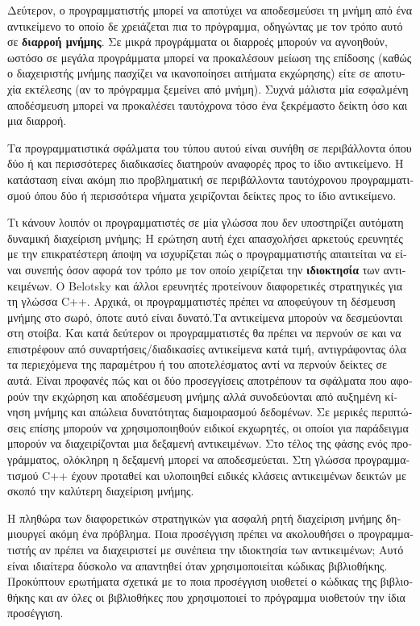 \begin{greek}
Δεύτερον, ο προγραμματιστής μπορεί να αποτύχει να αποδεσμεύσει
τη μνήμη από ένα αντικείμενο το οποίο δε χρειάζεται πια το πρόγραμμα,
οδηγώντας με τον τρόπο αυτό σε \textbf{διαρροή μνήμης}. Σε μικρά
προγράμματα οι διαρροές μπορούν να αγνοηθούν, ωστόσο σε μεγάλα
προγράμματα μπορεί να προκαλέσουν μείωση της επίδοσης (καθώς
ο διαχειριστής μνήμης πασχίζει να ικανοποίησει αιτήματα εκχώρησης)
είτε σε αποτυχία εκτέλεσης (αν το πρόγραμμα ξεμείνει από μνήμη).
Συχνά μάλιστα μία εσφαλμένη αποδέσμευση μπορεί να προκαλέσει
ταυτόχρονα τόσο ένα ξεκρέμαστο δείκτη όσο και μια διαρροή.

Τα προγραμματιστικά σφάλματα του τύπου αυτού είναι συνήθη σε
περιβάλλοντα όπου δύο ή και περισσότερες διαδικασίες διατηρούν
αναφορές προς το ίδιο αντικείμενο. Η κατάσταση είναι ακόμη πιο
προβληματική σε περιβάλλοντα ταυτόχρονου προγραμματισμού όπου
δύο ή περισσότερα νήματα χειρίζονται δείκτες προς το ίδιο αντικείμενο.

Τι κάνουν λοιπόν οι προγραμματιστές σε μία γλώσσα που δεν υποστηρίζει
αυτόματη δυναμική διαχείριση μνήμης; Η ερώτηση αυτή έχει απασχολήσει
αρκετούς ερευνητές με την επικρατέστερη άποψη να ισχυρίζεται πώς
ο προγραμματιστής απαιτείται να είναι συνεπής όσον αφορά τον τρόπο
με τον οποίο χειρίζεται την \textbf{ιδιοκτησία} των αντικειμένων.
Ο Belotsky \cite{belo03} και άλλοι ερευνητές προτείνουν διαφορετικές
στρατηγικές για τη γλώσσα C++. Αρχικά, οι προγραμματιστές πρέπει
να αποφεύγουν τη δέσμευση μνήμης στο σωρό, όποτε αυτό είναι
δυνατό.Τα αντικείμενα μπορούν να δεσμεύονται στη στοίβα. Και
κατά δεύτερον οι προγραμματιστές θα πρέπει να περνούν σε και να
επιστρέφουν από συναρτήσεις/διαδικασίες αντικείμενα κατά τιμή,
αντιγράφοντας όλα τα περιεχόμενα της παραμέτρου ή του αποτελέσματος
αντί να περνούν δείκτες σε αυτά. Είναι προφανές πώς και οι δύο
προσεγγίσεις αποτρέπουν τα σφάλματα που αφορούν την εκχώρηση και
αποδέσμευση μνήμης αλλά συνοδεύονται από αυξημένη κίνηση μνήμης
και απώλεια δυνατότητας διαμοιρασμού δεδομένων. Σε μερικές περιπτώσεις
επίσης μπορούν να χρησιμοποιηθούν ειδικοί εκχωρητές, οι οποίοι
για παράδειγμα μπορούν να διαχειρίζονται μια δεξαμενή αντικειμένων.
Στο τέλος της φάσης ενός προγράμματος, ολόκληρη η δεξαμενή μπορεί
να αποδεσμεύεται. Στη γλώσσα προγραμματισμού C++ έχουν προταθεί
και υλοποιηθεί ειδικές κλάσεις αντικειμένων δεικτών με σκοπό
την καλύτερη διαχείριση μνήμης.

Η πληθώρα των διαφορετικών στρατηγικών για ασφαλή ρητή διαχείριση
μνήμης δημιουργεί ακόμη ένα πρόβλημα. Ποια προσέγγιση πρέπει
να ακολουθήσει ο προγραμματιστής αν πρέπει να διαχειριστεί με
συνέπεια την ιδιοκτησία των αντικειμένων; Αυτό είναι ιδιαίτερα
δύσκολο να απαντηθεί όταν χρησιμοποιείται κώδικας βιβλιοθήκης.
Προκύπτουν ερωτήματα σχετικά με το ποια προσέγγιση υιοθετεί ο
κώδικας της βιβλιοθήκης και αν όλες οι βιβλιοθήκες που χρησιμοποιεί
το πρόγραμμα υιοθετούν την ίδια προσέγγιση.


\end{greek}
